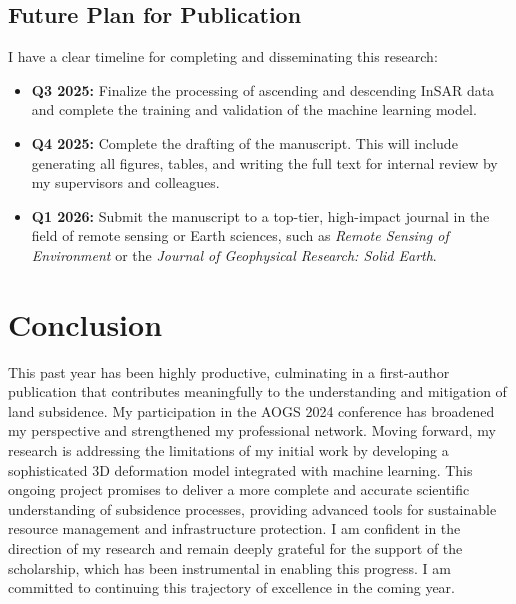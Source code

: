\documentclass[12pt, a4paper]{article}
\begin{document}
	\subsection{Future Plan for Publication}
	
	I have a clear timeline for completing and disseminating this research:
	\begin{itemize}
		\item \textbf{Q3 2025:} Finalize the processing of ascending and descending InSAR data and complete the training and validation of the machine learning model.
		\item \textbf{Q4 2025:} Complete the drafting of the manuscript. This will include generating all figures, tables, and writing the full text for internal review by my supervisors and colleagues.
		\item \textbf{Q1 2026:} Submit the manuscript to a top-tier, high-impact journal in the field of remote sensing or Earth sciences, such as \textit{Remote Sensing of Environment} or the \textit{Journal of Geophysical Research: Solid Earth}.
	\end{itemize}
	
	\section{Conclusion}
	
	This past year has been highly productive, culminating in a first-author publication that contributes meaningfully to the understanding and mitigation of land subsidence. My participation in the AOGS 2024 conference has broadened my perspective and strengthened my professional network. Moving forward, my research is addressing the limitations of my initial work by developing a sophisticated 3D deformation model integrated with machine learning. This ongoing project promises to deliver a more complete and accurate scientific understanding of subsidence processes, providing advanced tools for sustainable resource management and infrastructure protection. I am confident in the direction of my research and remain deeply grateful for the support of the scholarship, which has been instrumental in enabling this progress. I am committed to continuing this trajectory of excellence in the coming year.
	
\end{document}
